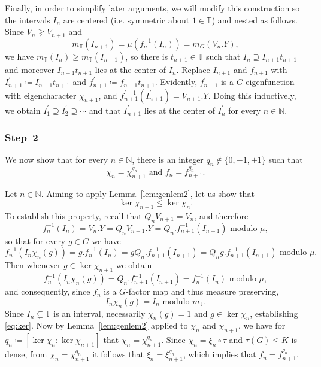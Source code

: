 \documentclass{amsart}
\numberwithin{equation}{subsection}
\theoremstyle{remark}
\begin{document}
Finally, in order to simplify later arguments, we will modify this construction so the intervals \(I_{n}\) are centered (i.e. symmetric about \(1\in\mathbb{T}\)) and nested as follows. Since \(V_{n}\gneq V_{n+1}\) and
\[m_{\mathbb{T}}\left(I_{n+1}\right)=\mu\left(f_{n}^{-1}\left(I_{n}\right)\right)=m_{G}\left(V_{n}.Y\right),\]
we have \(m_{\mathbb{T}}\left(I_{n}\right)\geq m_{\mathbb{T}}\left(I_{n+1}\right)\), so there is \(t_{n+1}\in\mathbb{T}\) such that \(I_{n}\supseteq I_{n+1}t_{n+1}\) and moreover \(I_{n+1}t_{n+1}\) lies at the center of \(I_{n}\). Replace \(I_{n+1}\) and \(f_{n+1}\) with \(I_{n+1}^{\prime}\coloneqq I_{n+1}t_{n+1}\) and \(f_{n+1}^{\prime}\coloneqq f_{n+1}t_{n+1}\). Evidently, \(f_{n+1}^{\prime}\) is a \(G\)-eigenfunction with eigencharacter \(\chi_{n+1}\), and \(f_{n+1}^{\prime -1}\left(I_{n+1}^{\prime}\right)=V_{n+1}.Y\). Doing this inductively, we obtain \(I_{1}^{\prime}\supseteq I_{2}^{\prime}\supseteq\dotsm\) and that \(I_{n+1}^{\prime}\) lies at the center of \(I_{n}^{\prime}\) for every \(n\in\mathbb{N}\).

\subsubsection*{\textbf{Step~2}}

We now show that for every \(n\in\mathbb{N}\), there is an integer \(q_{n}\notin\{0,-1,+1\}\) such that
\[\chi_{n}=\chi_{n+1}^{q_{n}}\text{ and }f_{n}=f_{n+1}^{q_{n}}.\]

\smallskip

Let \(n\in\mathbb{N}\). Aiming to apply Lemma~\ref{lem:genlem2}, let us show that
\begin{equation}\label{eq:ker}
\ker\chi_{n+1}\leq\ker\chi_{n}.
\end{equation}
To establish this property, recall that \(Q_{n}V_{n+1}=V_{n}\), and therefore
\[f_{n}^{-1}\left(I_{n}\right)=V_{n}.Y=Q_{n}V_{n+1}.Y=Q_{n}.f_{n+1}^{-1}\left(I_{n+1}\right)\text{ modulo }\mu,\]
so that for every \(g\in G\) we have
\[f_{n}^{-1}\left(I_{n}\chi_{n}\left(g\right)\right)=g.f_{n}^{-1}\left(I_{n}\right)=gQ_{n}.f_{n+1}^{-1}\left(I_{n+1}\right)=Q_{n}g.f_{n+1}^{-1}\left(I_{n+1}\right)\text{ modulo }\mu.\]
Then whenever \(g\in\ker\chi_{n+1}\) we obtain
\[f_{n}^{-1}\left(I_{n}\chi_{n}\left(g\right)\right)=Q_{n}.f_{n+1}^{-1}\left(I_{n+1}\right)=f_{n}^{-1}\left(I_{n}\right)\text{ modulo }\mu,\]
and consequently, since \(f_{n}\) is a \(G\)-factor map and thus measure preserving,
\[I_{n}\chi_{n}\left(g\right)=I_{n}\text{ modulo }m_{\mathbb{T}}.\]
Since \(I_{n}\subsetneq\mathbb{T}\) is an interval, necessarily \(\chi_{n}\left(g\right)=1\) and \(g\in\ker\chi_{n}\), establishing \eqref{eq:ker}. Now by Lemma~\ref{lem:genlem2} applied to \(\chi_{n}\) and \(\chi_{n+1}\), we have for \(q_{n}\coloneqq\left[\ker\chi_{n}:\ker\chi_{n+1}\right]\) that \(\chi_{n}=\chi_{n+1}^{q_{n}}\). Since \(\chi_{n}=\xi_{n}\circ\tau\) and \(\tau\left(G\right)\leq K\) is dense, from \(\chi_{n}=\chi_{n+1}^{q_{n}}\) it follows that \(\xi_{n}=\xi_{n+1}^{q_{n}}\), which implies that \(f_{n}=f_{n+1}^{q_{n}}\).
\end{document}
